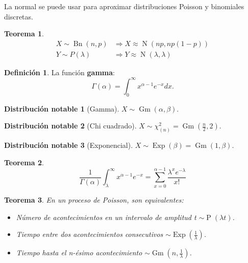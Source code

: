\documentclass{article}
\newtheorem{theorem}{Teorema}
\theoremstyle{definition}
\newtheorem{define}{Definición}
\newtheorem{distr}{Distribución notable}
\theoremstyle{remark}
\DeclareMathOperator{\binomial}{Bn}
\DeclareMathOperator{\poisson}{P}
\DeclareMathOperator{\normal}{N}
\DeclareMathOperator{\gammad}{Gm}
\DeclareMathOperator{\exponencial}{Exp}
\begin{document}
La normal se puede usar para aproximar distribuciones Poisson y binomiales discretas.

\begin{theorem}
	\begin{align*}
		X \sim \binomial(n, p) &\Rightarrow X \approx \normal(np, np(1-p))\\
		Y \sim P(\lambda) &\Rightarrow Y \approx \normal(\lambda, \lambda)
	\end{align*}
\end{theorem}

\begin{define}
	La función \textbf{gamma}:
	\begin{equation*}
		\Gamma(\alpha) = \int_{0}^{\infty} x^{\alpha - 1}e^{-x} dx.
	\end{equation*}
\end{define}

\begin{distr}[Gamma]
	$X \sim \gammad(\alpha, \beta)$.
\end{distr}

\begin{distr}[Chi cuadrado]
	$X \sim \chi_{(n)}^{2} = \gammad(\frac{n}{2}, 2)$.
\end{distr}

\begin{distr}[Exponencial]
	$X \sim \exponencial(\beta) = \gammad(1, \beta)$.
\end{distr}

\begin{theorem}
	\begin{equation*}
		\frac{1}{\Gamma(\alpha)} \int_{\lambda}^{\infty} x^{\alpha-1}e^{-x} = \sum_{x = 0}^{\alpha - 1} \frac{\lambda^x e^{-\lambda}}{x!}
	\end{equation*}
\end{theorem}

\begin{theorem}
	En un proceso de Poisson, son equivalentes:
	\begin{itemize}
		\item
		Número de acontecimientos en un intervalo de amplitud t $\sim \poisson(\lambda t)$.
		\item
		Tiempo entre dos acontecimientos consecutivos $\sim \exponencial(\frac{1}{\lambda})$.
		\item
		Tiempo hasta el n-ésimo acontecimiento $\sim \gammad(n, \frac{1}{\lambda})$.
	\end{itemize}
\end{theorem}
\end{document}
